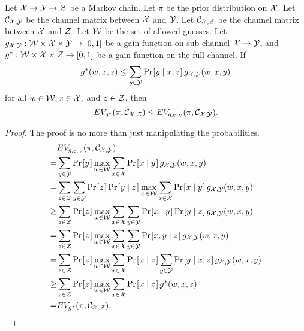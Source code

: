 \begin{theorem} \label{thm DPI 1}
	Let $\mathcal{X} \rightarrow \mathcal{Y} \rightarrow \mathcal{Z}$ be a Markov chain. Let $\pi$ be the prior distribution on $\mathcal{X}$. Let $\mathcal{C}_{\mathcal{X}, \mathcal{Y}}$ be the channel matrix between $\mathcal{X}$ and $\mathcal{Y}$. Let $\mathcal{C}_{\mathcal{X},\mathcal{Z}}$ be the channel matrix between $\mathcal{X}$ and $\mathcal{Z}$. Let $\mathcal{W}$ be the set of allowed guesses. Let $g_{\mathcal{X},\mathcal{Y}}: \mathcal{W} \times \mathcal{X} \times \mathcal{Y} \rightarrow [0,1]$ be a gain function on sub-channel $\mathcal{X} \rightarrow \mathcal{Y}$, and $g^{*}: \mathcal{W} \times \mathcal{X} \times \mathcal{Z} \rightarrow [0,1]$ be a gain function on the full channel. If
	\begin{equation} \label{thm DPI 1 condition}
		g^{*}(w, x, z) \leq \sum_{y \in \Y} \prob{y \mid x, z} g_{\X, \Y}(w, x, y)
	\end{equation}
	for all $w \in \mathcal{W}, x \in \mathcal{X},$ and $z \in \mathcal{Z}$, then
	\begin{equation*}
		EV_{g^{*}}(\pi, \mathcal{C}_{\mathcal{X},\mathcal{Z}}) \leq EV_{g_{\mathcal{X},\mathcal{Y}}}(\pi, \mathcal{C}_{\mathcal{X},\mathcal{Y}}).
	\end{equation*}
\end{theorem}


\begin{proof}
	The proof is no more than just manipulating the probabilities.
	\begin{align*}
	  &	EV_{g_{\X,\Y}}(\pi, \channel_{\X,\Y}) \\
	= & \sum_{y \in \Y} \prob{y} \max_{w \in \W} \sum_{x \in \X} \prob{x \mid y} g_{\X,\Y}(w, x, y) \\
  	= & \sum_{z \in \Z} \sum_{y \in \Y} \prob{z} \prob{y \mid z} \max_{w \in \W} \sum_{x \in \X} \prob{x \mid y} g_{\X,\Y}(w, x, y) \\
  	\geq & \sum_{z \in \Z} \prob{z} \max_{w \in \W} \sum_{x \in \X} \sum_{y \in \Y} \prob{x \mid y} \prob{y \mid z} g_{\X,\Y}(w, x, y) \\
  	= & \sum_{z \in \Z} \prob{z} \max_{w \in \W} \sum_{x \in \X} \sum_{y \in \Y} \prob{x, y \mid z} g_{\X,\Y}(w, x, y) \\
  	= & \sum_{z \in \Z} \prob{z} \max_{w \in \W} \sum_{x \in \X} \prob{x \mid z} \sum_{y \in \Y} \prob{y \mid x, z} g_{\X,\Y}(w, x, y) \\
  	\geq & \sum_{z \in \Z} \prob{z} \max_{w \in \W} \sum_{x \in \X} \prob{x \mid z} g^{*}(w, x, z) \\
  	= & EV_{g^{*}}(\pi, \channel_{\X,\Z}).
	\end{align*}
\end{proof}

